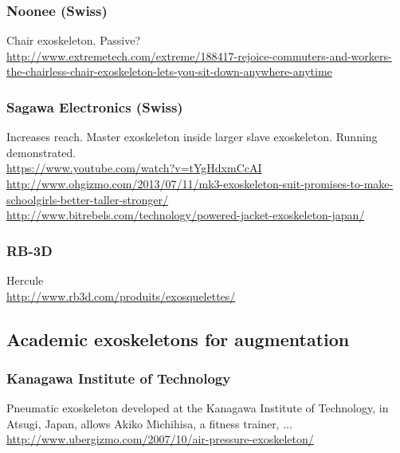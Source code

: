 \subsubsection{Noonee (Swiss)}

\noindent
Chair exoskeleton. Passive?\\
\url{http://www.extremetech.com/extreme/188417-rejoice-commuters-and-workers-the-chairless-chair-exoskeleton-lets-you-sit-down-anywhere-anytime}\\

\subsubsection{Sagawa Electronics (Swiss)}

\noindent
Increases reach. Master exoskeleton inside larger slave exoskeleton. Running
demonstrated.\\
\url{https://www.youtube.com/watch?v=tYgHdxmCcAI}\\
\url{http://www.ohgizmo.com/2013/07/11/mk3-exoskeleton-suit-promises-to-make-schoolgirls-better-taller-stronger/}\\
\url{http://www.bitrebels.com/technology/powered-jacket-exoskeleton-japan/}\\

\subsubsection{RB-3D}

\noindent
Hercule\\
\url{http://www.rb3d.com/produits/exosquelettes/}\\



\subsection{Academic exoskeletons for augmentation}

\subsubsection{Kanagawa Institute of Technology}

\noindent
Pneumatic exoskeleton developed at the Kanagawa Institute of Technology,
in Atsugi, Japan, allows Akiko Michihisa, a fitness trainer, ...\\
\url{http://www.ubergizmo.com/2007/10/air-pressure-exoskeleton/}\\

